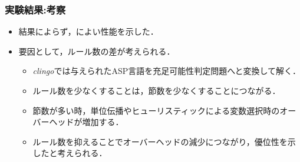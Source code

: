 
\begin{frame}\frametitle{実験結果:考察}

  \begin{itemize}
    \item 結果によらず，によい性能を示した．
    \item 要因として，\alert{ルール数の差}が考えられる．
    \begin{itemize}
      \item \textit{clingo}では与えられたASP言語を充足可能性判定問題へと変換して解く．
      \item ルール数を少なくすることは，節数を少なくすることにつながる．
      \item 節数が多い時，単位伝播やヒューリスティックによる変数選択時のオーバーヘッドが増加する．
      \item ルール数を抑えることでオーバーヘッドの減少につながり，優位性を示したと考えられる．
    \end{itemize}
  \end{itemize}
  
\end{frame}

\backupend
